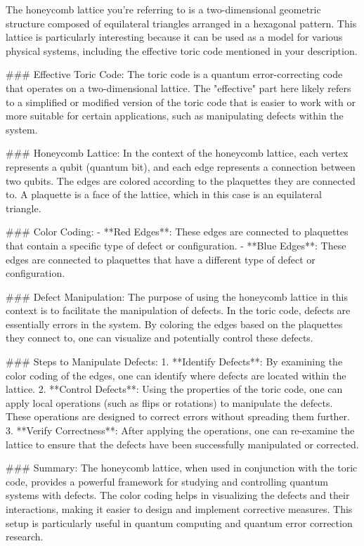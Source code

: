 The honeycomb lattice you're referring to is a two-dimensional geometric structure composed of equilateral triangles arranged in a hexagonal pattern. This lattice is particularly interesting because it can be used as a model for various physical systems, including the effective toric code mentioned in your description.

### Effective Toric Code:
The toric code is a quantum error-correcting code that operates on a two-dimensional lattice. The "effective" part here likely refers to a simplified or modified version of the toric code that is easier to work with or more suitable for certain applications, such as manipulating defects within the system.

### Honeycomb Lattice:
In the context of the honeycomb lattice, each vertex represents a qubit (quantum bit), and each edge represents a connection between two qubits. The edges are colored according to the plaquettes they are connected to. A plaquette is a face of the lattice, which in this case is an equilateral triangle.

### Color Coding:
- **Red Edges**: These edges are connected to plaquettes that contain a specific type of defect or configuration.
- **Blue Edges**: These edges are connected to plaquettes that have a different type of defect or configuration.

### Defect Manipulation:
The purpose of using the honeycomb lattice in this context is to facilitate the manipulation of defects. In the toric code, defects are essentially errors in the system. By coloring the edges based on the plaquettes they connect to, one can visualize and potentially control these defects.

### Steps to Manipulate Defects:
1. **Identify Defects**: By examining the color coding of the edges, one can identify where defects are located within the lattice.
2. **Control Defects**: Using the properties of the toric code, one can apply local operations (such as flips or rotations) to manipulate the defects. These operations are designed to correct errors without spreading them further.
3. **Verify Correctness**: After applying the operations, one can re-examine the lattice to ensure that the defects have been successfully manipulated or corrected.

### Summary:
The honeycomb lattice, when used in conjunction with the toric code, provides a powerful framework for studying and controlling quantum systems with defects. The color coding helps in visualizing the defects and their interactions, making it easier to design and implement corrective measures. This setup is particularly useful in quantum computing and quantum error correction research.